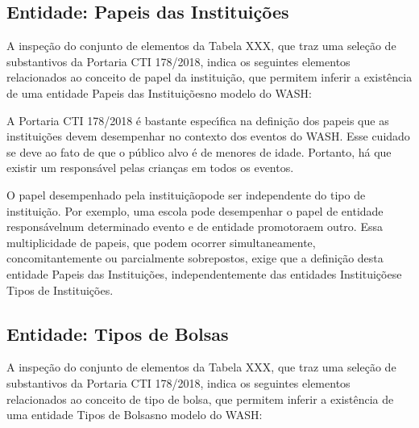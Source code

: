 \documentclass[
12pt,		%
openright,	%
twoside,  %
a4paper,			%
chapter=TITLE,		%
english,			%
french,				%
spanish,			%
brazil				%
]{USPSC-classe/USPSC}
\begin{document}
\subsection[Entidade: Papeis das Institui\c{c}\~oes]{Entidade: Papeis das Institui\c{c}\~oes}\label{Entidade: Papeis das Institui\c{c}\~oes}
A inspe\c{c}\~ao do conjunto de elementos da Tabela XXX, que traz uma sele\c{c}\~ao de substantivos da Portaria CTI 178/2018, indica os seguintes elementos relacionados ao conceito de \textquotedbl papel da institui\c{c}\~ao\textquotedbl , que permitem inferir a exist\^encia de uma entidade \textquotedbl Papeis das Institui\c{c}\~oes\textquotedbl  no modelo do WASH:



\noindent\begin{center}\mbox{\centering{}}\end{center}


A Portaria CTI 178/2018 \'e bastante espec\'{\i}fica na defini\c{c}\~ao dos papeis que as institui\c{c}\~oes devem desempenhar no contexto dos eventos do WASH. Esse cuidado se deve ao fato de que o p\'ublico alvo \'e de menores de idade. Portanto, h\'a que existir um respons\'avel pelas crian\c{c}as em todos os eventos.


O \textquotedbl papel desempenhado pela institui\c{c}\~ao\textquotedbl  pode ser independente do \textquotedbl tipo de institui\c{c}\~ao\textquotedbl . Por exemplo, uma escola pode desempenhar o papel de \textquotedbl entidade respons\'avel\textquotedbl  num determinado evento e de \textquotedbl entidade promotora\textquotedbl  em outro. Essa multiplicidade de papeis, que podem ocorrer simultaneamente, concomitantemente ou parcialmente sobrepostos, exige que a defini\c{c}\~ao desta entidade \textquotedbl Papeis das Institui\c{c}\~oes\textquotedbl , independentemente das entidades \textquotedbl Institui\c{c}\~oes\textquotedbl  e \textquotedbl Tipos de Institui\c{c}\~oes\textquotedbl .


\subsection[Entidade: Tipos de Bolsas]{Entidade: Tipos de Bolsas}\label{Entidade: Tipos de Bolsas}
A inspe\c{c}\~ao do conjunto de elementos da Tabela XXX, que traz uma sele\c{c}\~ao de substantivos da Portaria CTI 178/2018, indica os seguintes elementos relacionados ao conceito de \textquotedbl tipo de bolsa\textquotedbl , que permitem inferir a exist\^encia de uma entidade \textquotedbl Tipos de Bolsas\textquotedbl  no modelo do WASH:
\end{document}
